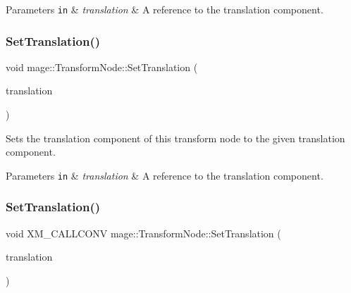 \begin{DoxyParams}[1]{Parameters}
\mbox{\tt in}  & {\em translation} & A reference to the translation component. \\
\hline
\end{DoxyParams}
\hypertarget{structmage_1_1_transform_node_af62e3d540778f236ba7b2fd914d369a6}{}\label{structmage_1_1_transform_node_af62e3d540778f236ba7b2fd914d369a6} 
\subsubsection{\texorpdfstring{Set\+Translation()}{SetTranslation()}\hspace{0.1cm}{\footnotesize\ttfamily [3/4]}}
{\footnotesize\ttfamily void mage\+::\+Transform\+Node\+::\+Set\+Translation (\begin{DoxyParamCaption}\item[{X\+M\+F\+L\+O\+A\+T3 \&\&}]{translation }\end{DoxyParamCaption})\hspace{0.3cm}{\ttfamily [noexcept]}}

Sets the translation component of this transform node to the given translation component.


\begin{DoxyParams}[1]{Parameters}
\mbox{\tt in}  & {\em translation} & A reference to the translation component. \\
\hline
\end{DoxyParams}
\hypertarget{structmage_1_1_transform_node_a958f614a6a534d26ac1d3eab3bea5ccb}{}\label{structmage_1_1_transform_node_a958f614a6a534d26ac1d3eab3bea5ccb} 
\subsubsection{\texorpdfstring{Set\+Translation()}{SetTranslation()}\hspace{0.1cm}{\footnotesize\ttfamily [4/4]}}
{\footnotesize\ttfamily void X\+M\+\_\+\+C\+A\+L\+L\+C\+O\+NV mage\+::\+Transform\+Node\+::\+Set\+Translation (\begin{DoxyParamCaption}\item[{F\+X\+M\+V\+E\+C\+T\+OR}]{translation }\end{DoxyParamCaption})\hspace{0.3cm}{\ttfamily [noexcept]}}

